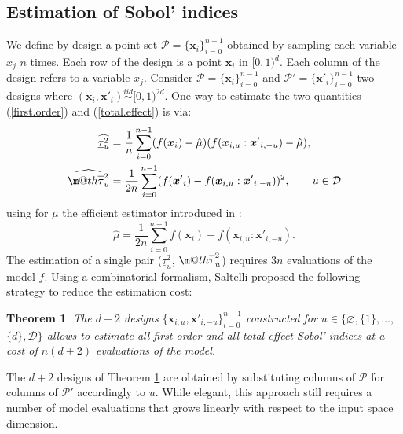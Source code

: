\documentclass[]{elsarticle}
\makeatletter
\newtheorem{theorem}{Theorem}
\theoremstyle{definition}
\newcommand{\bvec}[1]{\boldsymbol{#1}}
\newcommand{\vx}{\bvec{x}}
\newcommand\iid{\stackrel{iid}{\sim}}
\newcommand*{\ov}[1]{
  \m@th\overline{\mbox{#1}\raisebox{2mm}{}}
}
\makeatother
\begin{document}
\subsection{Estimation of Sobol' indices}

We define by design a point set $\mathcal{P}=\{\vx_i\}_{i=0}^{n-1}$ obtained by sampling each variable $x_j$ $n$ times. Each row of the design is a point $\vx_i$ in $[0,1)^d$. Each column of the design refers to a variable $x_j$. Consider $\mathcal{P}=\{\vx_i\}_{i=0}^{n-1}$ and $\mathcal{P'}=\{{\vx'}_i\}_{i=0}^{n-1}$ two designs where $(\vx_i,{\vx'}_i) \iid [0,1)^{2d}$. One way to estimate the two quantities (\ref{first.order}) and (\ref{total.effect}) is via:
\begin{align}
\label{first.order.est}
\widehat{\underline{\tau}_u^2} & = \frac{1}{n} \sum \limits_{i=0}^{n-1} (f(\vx_i)-\hat{\mu})(f(\vx_{i,u}:{\vx'}_{i,-u})-\hat{\mu}),\\
\label{total.effect.est}
\widehat{\ov{$\tau$}_u^2} & = \frac{1}{2n} \sum \limits_{i=0}^{n-1} (f({\vx'}_i) - f(\vx_{i,u}:{\vx'}_{i,-u}))^2, \qquad u \in \mathcal{D}
\end{align}
using for $\mu$ the efficient estimator introduced in \cite{Monod, Janon}:
\begin{equation}
 \hat{\mu} = \frac{1}{2n} \sum \limits_{i=0}^{n-1} f(\vx_i) + f(\vx_{i,u}:{\vx'}_{i,-u}).
\label{mu.est}
\end{equation}
The estimation of a single pair ($\underline{\tau}_u^2$, $\ov{$\tau$}_u^2$) requires $3n$ evaluations of the model $f$. Using a combinatorial formalism, Saltelli \cite[Theorem 1]{Saltelli} proposed the following strategy to reduce the estimation cost:
\begin{theorem}
\label{saltelli.theorem}
The $d+2$ designs $\{\vx_{i,u},{\vx'}_{i,-u}\}_{i=0}^{n-1}$ constructed for $u \in \{\varnothing,\{1\},\dots,$ $\{d\},\mathcal{D}\}$ allows to estimate all first-order and all total effect Sobol' indices at a cost of $n(d+2)$ evaluations of the model.
\end{theorem}
The $d+2$ designs of Theorem \ref{saltelli.theorem} are obtained by substituting columns of $\mathcal{P}$ for columns of $\mathcal{P}'$ accordingly to $u$. While elegant, this approach still requires a number of model evaluations that grows linearly with respect to the input space dimension.
\end{document}
